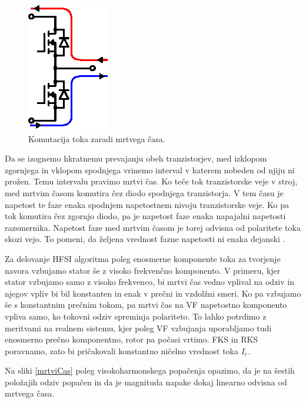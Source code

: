 \documentclass[a4paper,twoside,openright,12pt,slovene]{book}
\begin{document}
\begin{figure}[!htbp]
    \centering
    \includegraphics[width=0.4\columnwidth]{Slike/Inkscape/mrtviCasRazlaga.eps}
    \caption{\label{mrtviCasRazlaga} Komutacija toka zaradi mrtvega časa.}
\end{figure}

Da se izognemo hkratnemu prevajanju obeh tranzistorjev, med izklopom zgornjega in vklopom spodnjega vrinemo interval v katerem nobeden od njiju ni prožen. Temu intervalu pravimo mrtvi čas. Ko teče tok
tranzistorske veje v stroj, med mrtvim časom komutira čez diodo spodnjega tranzistorja. V tem času je napetost te faze enaka spodnjem napetostnem nivoju tranzistorske veje. Ko pa tok komutira čez
zgornjo diodo, pa je napetost faze enaka napajalni napetosti razsmernika. Napetost faze med mrtvim časom je torej odvisna od polaritete toka skozi vejo. To pomeni, da željena vrednost fazne napetosti
ni enaka dejanski \cite{ambrovzivc2016elektrivcni}. 

Za delovanje HFSI algoritma poleg enosmerne komponente toka za tvorjenje navora vzbujamo stator še z visoko frekvenčno komponento. V primeru, kjer stator vzbujamo samo z visoko frekvenco, bi mrtvi čas
vedno vplival na odziv in njegov vpliv bi bil konstanten in enak v prečni in vzdolžni smeri. Ko pa vzbujamo še s konstantnim prečnim tokom, pa mrtvi čas na VF napetostno komponento vpliva samo, ko
tokovni odziv spreminja polariteto. To lahko potrdimo z meritvami na realnem sistemu, kjer poleg VF vzbujanja uporabljamo tudi enosmerno prečno komponentno, rotor pa počasi vrtimo. FKS in RKS
poravnamo, zato bi pričakovali konstantno ničelno vrednost toka $I_e$.

Na sliki \ref{mrtviCas} poleg visokoharmonskega popačenja opazimo, da je na šestih položajih odziv popačen in da je magnituda napake dokaj linearno odvisna od mrtvega časa.
\end{document}
